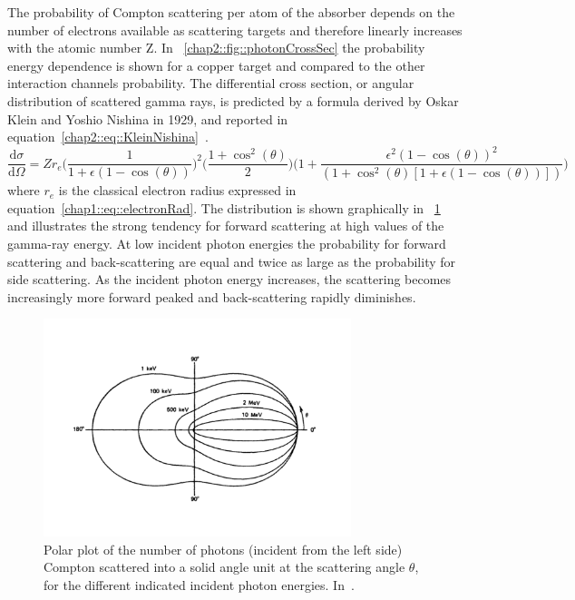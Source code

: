 The probability of Compton scattering per atom of the absorber depends on the number of electrons available as scattering targets and therefore linearly increases with the atomic number Z. In \figurename~\ref{chap2::fig::photonCrossSec} the probability energy dependence is shown for a copper target and compared to the other interaction channels probability. The differential cross section, or angular distribution of scattered gamma rays, is predicted by a formula derived by Oskar Klein and Yoshio Nishina in 1929, and reported in equation~\ref{chap2::eq::KleinNishina}~\parencite{Klein1929}.
 \begin{equation}
\frac{\mathrm{d}\sigma}{\mathrm{d}\Omega} = Zr_{e}\bigg(\frac{1}{1+\epsilon (1-\cos(\theta))}\bigg)^{2}\bigg( \frac{1+\cos^2(\theta)}{2} \bigg)\bigg(1+\frac{\epsilon^2(1-\cos(\theta))^2}{(1+\cos^2(\theta)[1+\epsilon(1-\cos(\theta))])} \bigg) 
\label{chap2::eq::KleinNishina}
\end{equation} 
where $r_{e}$ is the classical electron radius expressed in equation~\ref{chap1::eq::electronRad}. The distribution is shown graphically in \figurename~\ref{chap2::fig::ComptonAngCrossSection} and illustrates the strong tendency for forward scattering at high values of the gamma-ray energy. At low incident photon energies the probability for forward scattering and back-scattering are equal and twice as large as the probability for side scattering. As the incident photon energy increases, the scattering becomes increasingly more forward peaked and back-scattering rapidly diminishes.

\begin{figure}[!htbp]
\centering
\includegraphics[width=0.8\textwidth]{03_GraphicFiles/chapter2_GammaCameras/ComptonPolar.pdf}
\caption{Polar plot of the number of photons (incident from the left side) Compton scattered into a solid angle unit at the scattering angle $\theta$, for the different indicated incident photon energies. In~\cite{Knoll2000}.}
\label{chap2::fig::ComptonAngCrossSection}
\end{figure}
 
